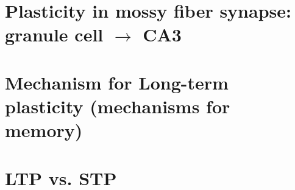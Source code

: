 \section{Plasticity in mossy fiber synapse: granule cell $\rightarrow$ CA3}



\section{Mechanism for Long-term plasticity (mechanisms for memory)}

% 









% 
% 
% 
% 
% 






\section{LTP vs. STP}


